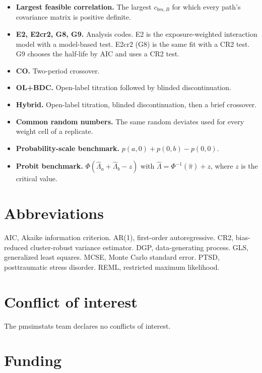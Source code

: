 \documentclass[
  11pt,
]{article}
\begin{document}
\begin{itemize}
  visit is the previous visit's mean times the decay factor. The
  earlier run of this paper used it.
\item
  \textbf{Largest feasible correlation.} The largest \(c_{bm,B}\) for which
  every path's covariance matrix is positive definite.
\item
  \textbf{E2, E2cr2, G8, G9.} Analysis codes. E2 is the exposure-weighted
  interaction model with a model-based test. E2cr2 (G8) is the same
  fit with a CR2 test. G9 chooses the half-life by AIC and uses a CR2
  test.
\item
  \textbf{CO.} Two-period crossover.
\item
  \textbf{OL+BDC.} Open-label titration followed by blinded
  discontinuation.
\item
  \textbf{Hybrid.} Open-label titration, blinded discontinuation, then a
  brief crossover.
\item
  \textbf{Common random numbers.} The same random deviates used for every
  weight cell of a replicate.
\item
  \textbf{Probability-scale benchmark.} \(p(a, 0) + p(0, b) - p(0, 0)\).
\item
  \textbf{Probit benchmark.} \(\Phi(\hat\Lambda_a + \hat\Lambda_b - z)\)
  with \(\hat\Lambda = \Phi^{-1}(\hat\pi) + z\), where \(z\) is the
  critical value.
\end{itemize}

\section*{Abbreviations}\label{abbreviations}

AIC, Akaike information criterion. AR(1), first-order autoregressive.
CR2, bias-reduced cluster-robust variance estimator. DGP,
data-generating process. GLS, generalized least squares. MCSE, Monte
Carlo standard error. PTSD, posttraumatic stress disorder. REML,
restricted maximum likelihood.

\section*{Conflict of interest}\label{conflict-of-interest}

The pmsimstats team declares no conflicts of interest.

\section*{Funding}\label{funding}
\end{document}
